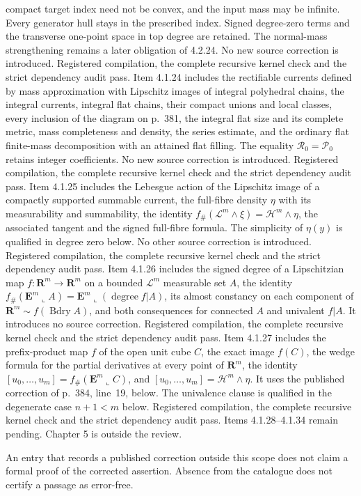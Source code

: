 \documentclass[11pt]{article}
\newcommand{\R}{\mathbf R}
\newcommand{\Leb}{\mathscr L}
\newcommand{\Haus}{\mathscr H}
\begin{document}
\begin{itemize}
compact target index need not be convex, and the input mass may be
infinite. Every generator hull stays in the prescribed index. Signed
degree-zero terms and the transverse one-point space in top degree are
retained. The normal-mass strengthening remains a later obligation of
4.2.24. No new source correction is introduced. Registered compilation,
the complete recursive kernel check and the strict dependency audit pass.
Item 4.1.24 includes the rectifiable currents defined by mass
approximation with Lipschitz images of integral polyhedral chains, the
integral currents, integral flat chains, their compact unions and local
classes, every inclusion of the diagram on p.~381, the integral flat
size and its complete metric, mass completeness and density, the series
estimate, and the ordinary flat finite-mass decomposition with an attained
flat filling. The equality $\mathscr R_0=\mathscr P_0$ retains integer
coefficients. No new source correction is introduced. Registered
compilation, the complete recursive kernel check and the strict
dependency audit pass.
Item 4.1.25 includes the Lebesgue action of the Lipschitz image of a
compactly supported summable current, the full-fibre density $\eta$ with
its measurability and summability, the identity
$f_\#(\Leb^m\wedge\xi)=\Haus^m\wedge\eta$, the associated tangent and
the signed full-fibre formula. The simplicity of $\eta(y)$ is qualified
in degree zero below. No other source correction is introduced.
Registered compilation, the complete recursive kernel check and the
strict dependency audit pass.
Item 4.1.26 includes the signed degree of a Lipschitzian map
$f:\mathbf R^m\to\mathbf R^m$ on a bounded $\Leb^m$ measurable set $A$,
the identity $f_\#(\mathbf E^m\mathop{\llcorner}A)=\mathbf E^m\mathop{\llcorner}(\operatorname{degree}f|A)$,
its almost constancy on each component of
$\mathbf R^m\sim f(\operatorname{Bdry}A)$, and both consequences for
connected $A$ and univalent $f|A$. It introduces no source correction.
Registered compilation, the complete recursive kernel check and the
strict dependency audit pass.
Item 4.1.27 includes the prefix-product map $f$ of the open unit cube $C$,
the exact image $f(C)$, the wedge formula for the partial derivatives at
every point of $\R^m$, the identity
$[u_0,\dots,u_m]=f_\#(\mathbf E^m\mathop{\llcorner}C)$, and
$[u_0,\dots,u_m]=\Haus^m\wedge\eta$. It uses the published correction of
p.~384, line~19, below. The univalence clause is qualified in the
degenerate case $n+1<m$ below. Registered compilation, the complete
recursive kernel check and the strict dependency audit pass.
Items 4.1.28--4.1.34 remain pending.
Chapter 5 is outside the review.
\end{itemize}
An entry that records a published correction outside this scope does not
claim a formal proof of the corrected assertion. Absence from the
catalogue does not certify a passage as error-free.
\end{document}
